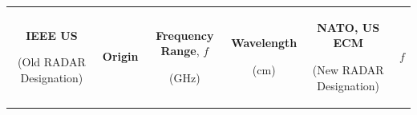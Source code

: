 \documentclass[
]{book}
\begin{document}
\begin{longtable}[]{@{}clcccc@{}}
\toprule
\begin{minipage}[b]{0.14\columnwidth}\centering
\textbf{IEEE US}

(Old RADAR Designation)\strut
\end{minipage} & \begin{minipage}[b]{0.25\columnwidth}\raggedright
\textbf{Origin}\strut
\end{minipage} & \begin{minipage}[b]{0.15\columnwidth}\centering
\textbf{Frequency Range}, \(f\)

(GHz)\strut
\end{minipage} & \begin{minipage}[b]{0.09\columnwidth}\centering
\textbf{Wavelength}

(cm)\strut
\end{minipage} & \begin{minipage}[b]{0.14\columnwidth}\centering
\textbf{NATO, US ECM}

(New RADAR Designation)\strut
\end{minipage} & \begin{minipage}[b]{0.06\columnwidth}\centering
\(f\)


\end{minipage}
\end{longtable}
\end{document}

